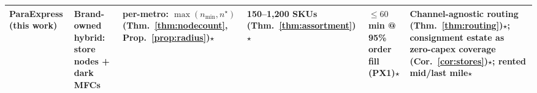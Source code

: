 \begin{table}[t]
\begin{tabular}{@{}p{1.9cm}p{2.6cm}p{2.9cm}p{2.0cm}p{2.2cm}p{4.0cm}@{}}
\midrule
\textbf{ParaExpress (this work)} & \textbf{Brand-owned hybrid}: store nodes + dark MFCs & per-metro: $\max(n_{\min},n^\star)$ (Thm.~\ref{thm:nodecount}, Prop.~\ref{prop:radius})$\star$ & 150--1,200 SKUs (Thm.~\ref{thm:assortment})$\star$ & $\le 60$\,min @ 95\% order fill (PX1)$\star$ & Channel-agnostic routing (Thm.~\ref{thm:routing})$\star$; consignment estate as zero-capex coverage (Cor.~\ref{cor:stores})$\star$; rented mid/last mile$\star$\\
\bottomrule
\end{tabular}
\end{table}
